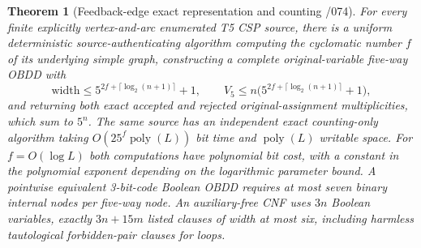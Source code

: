 \documentclass[11pt]{article}
\newtheorem{theorem}{Theorem}
\begin{document}
\begin{theorem}[Feedback-edge exact representation and counting /074]
For every finite explicitly vertex-and-arc enumerated T5 CSP source,
there is a uniform deterministic source-authenticating algorithm
computing the cyclomatic number $f$ of its underlying simple graph,
constructing a complete original-variable five-way OBDD with
\[
 \mathrm{width}\le 5^{2f+\lceil\log_2(n+1)\rceil}+1,\qquad
 V_5\le n\bigl(5^{2f+\lceil\log_2(n+1)\rceil}+1\bigr),
\]
and returning both exact accepted and rejected original-assignment
multiplicities, which sum to $5^n$. The same source has an independent
exact counting-only algorithm taking $O(25^f\operatorname{poly}(L))$
bit time and $\operatorname{poly}(L)$ writable space. For
$f=O(\log L)$ both computations have polynomial bit cost, with a
constant in the polynomial exponent depending on the logarithmic
parameter bound. A pointwise equivalent 3-bit-code Boolean OBDD
requires at most seven binary internal nodes per five-way node.
An auxiliary-free CNF uses $3n$ Boolean variables, exactly
$3n+15m$ listed clauses of width at most six, including harmless
tautological forbidden-pair clauses for loops.
\end{theorem}
\end{document}
